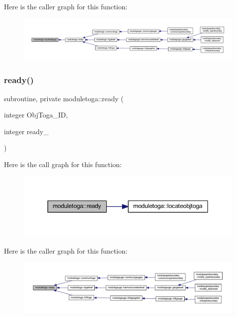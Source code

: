 Here is the caller graph for this function\+:\nopagebreak
\begin{figure}[H]
\begin{center}
\leavevmode
\includegraphics[width=350pt]{namespacemoduletoga_a0dcf3a4301085371bb48ab041d1cec59_icgraph}
\end{center}
\end{figure}
\mbox{\label{namespacemoduletoga_a62311ad918280d20f2f5383ab0a8dac4}} 
\subsubsection{\texorpdfstring{ready()}{ready()}}
{\footnotesize\ttfamily subroutine, private moduletoga\+::ready (\begin{DoxyParamCaption}\item[{integer}]{Obj\+Toga\+\_\+\+ID,  }\item[{integer}]{ready\+\_\+ }\end{DoxyParamCaption})\hspace{0.3cm}{\ttfamily [private]}}

Here is the call graph for this function\+:\nopagebreak
\begin{figure}[H]
\begin{center}
\leavevmode
\includegraphics[width=344pt]{namespacemoduletoga_a62311ad918280d20f2f5383ab0a8dac4_cgraph}
\end{center}
\end{figure}
Here is the caller graph for this function\+:\nopagebreak
\begin{figure}[H]
\begin{center}
\leavevmode
\includegraphics[width=350pt]{namespacemoduletoga_a62311ad918280d20f2f5383ab0a8dac4_icgraph}
\end{center}
\end{figure}
\mbox{\label{namespacemoduletoga_a910478c59872b8cd57611ae642b29980}} 
